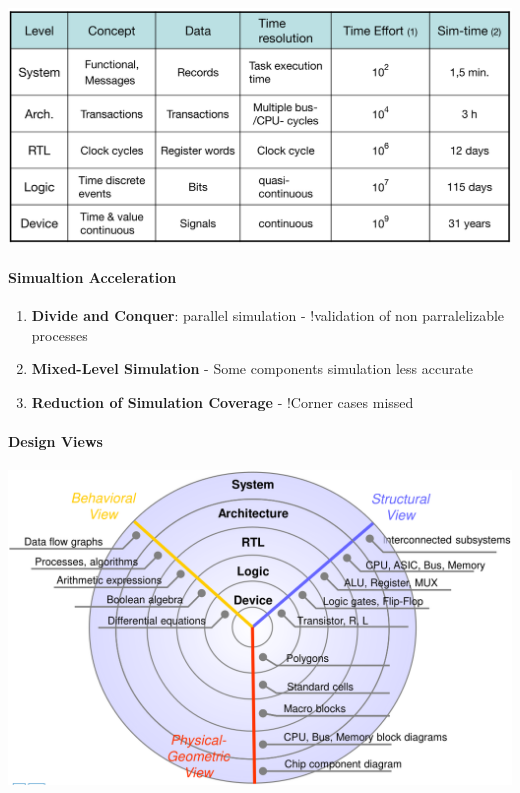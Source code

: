 \documentclass[english]{latex4ei/latex4ei_sheet}
\begin{document}
\begin{center}
  \includegraphics[width=0.8\linewidth]{assets/SimulationAccuracyTime.png}
\end{center}
 
\paragraph{Simualtion Acceleration}
\begin{enumerate}
  \item \textbf{Divide and Conquer}: parallel simulation - !validation of non parralelizable processes
  \item \textbf{Mixed-Level Simulation} - Some components simulation less accurate
\item \textbf{Reduction of Simulation Coverage} - !Corner cases missed
\end{enumerate}
 
\paragraph{Design Views}

\begin{center}
  \includegraphics[width=0.8\linewidth]{assets/DesignViews.png}
\end{center}
\end{document}

